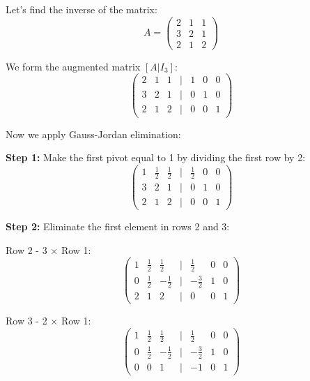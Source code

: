 Let's find the inverse of the matrix:
\begin{equation*}
A = 
\begin{pmatrix}
2 & 1 & 1 \\
3 & 2 & 1 \\
2 & 1 & 2
\end{pmatrix}
\end{equation*}

We form the augmented matrix \([A|I_3]\):
\begin{equation*}
\begin{pmatrix}
2 & 1 & 1 & | & 1 & 0 & 0 \\
3 & 2 & 1 & | & 0 & 1 & 0 \\
2 & 1 & 2 & | & 0 & 0 & 1
\end{pmatrix}
\end{equation*}

Now we apply Gauss-Jordan elimination:
\vspace{\baselineskip}

\textbf{Step 1:} Make the first pivot equal to 1 by dividing the first row by 2:
\begin{equation*}
\begin{pmatrix}
1 & \frac{1}{2} & \frac{1}{2} & | & \frac{1}{2} & 0 & 0 \\
3 & 2 & 1 & | & 0 & 1 & 0 \\
2 & 1 & 2 & | & 0 & 0 & 1
\end{pmatrix}
\end{equation*}

\textbf{Step 2:} Eliminate the first element in rows 2 and 3:

Row 2 - 3 \(\times\) Row 1:
\begin{equation*}
\begin{pmatrix}
1 & \frac{1}{2} & \frac{1}{2} & | & \frac{1}{2} & 0 & 0 \\
0 & \frac{1}{2} & -\frac{1}{2} & | & -\frac{3}{2} & 1 & 0 \\
2 & 1 & 2 & | & 0 & 0 & 1
\end{pmatrix}
\end{equation*}

Row 3 - 2 \(\times\) Row 1:
\begin{equation*}
\begin{pmatrix}
1 & \frac{1}{2} & \frac{1}{2} & | & \frac{1}{2} & 0 & 0 \\
0 & \frac{1}{2} & -\frac{1}{2} & | & -\frac{3}{2} & 1 & 0 \\
0 & 0 & 1 & | & -1 & 0 & 1
\end{pmatrix}
\end{equation*}

